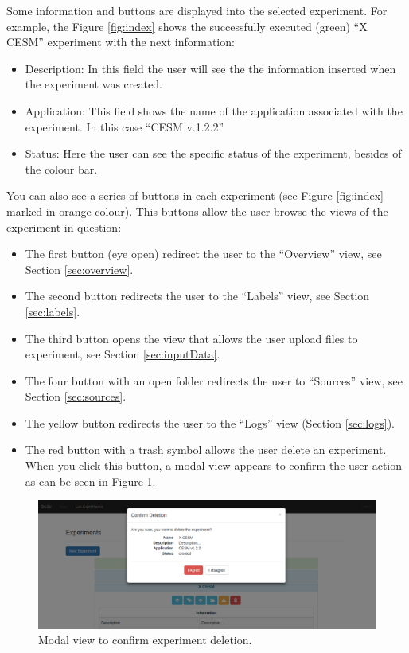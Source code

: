 \documentclass[11pt]{article}
\begin{document}
Some information and buttons are displayed into the selected experiment. For example, the Figure \ref{fig:index} shows the successfully executed (green) ``X CESM'' experiment with the next information:
\begin{itemize}
	\item Description: In this field the user will see the the information inserted when the experiment was created.
	\item Application: This field shows the name of the application associated with the experiment. In this case ``CESM v.1.2.2''
	\item Status: Here the user can see the specific status of the experiment, besides of the colour bar.
\end{itemize}

You can also see a series of buttons in each experiment (see Figure \ref{fig:index} marked in orange colour). This buttons allow the user browse the views of the experiment in question:
\begin{itemize}
	\item The first button (eye open) redirect the user to the ``Overview'' view, see Section \ref{sec:overview}.
	\item The second button redirects the user to the ``Labels'' view, see Section \ref{sec:labels}.
	\item The third button opens the view that allows the user upload files to experiment, see Section \ref{sec:inputData}.
	\item The four button with an open folder redirects the user to ``Sources'' view, see Section \ref{sec:sources}.
	\item The yellow button redirects the user to the ``Logs'' view (Section \ref{sec:logs}).
	\item The red button with a trash symbol allows the user delete an experiment. When you click this button, a modal view appears to confirm the user action as can be seen in Figure \ref{fig:index-delete}. 
\end{itemize}

\begin{figure}[htp]
\centering
\includegraphics[width=\linewidth]{img/index-delete}
\caption{Modal view to confirm experiment deletion.}
\label{fig:index-delete}
\end{figure}
\end{document}
